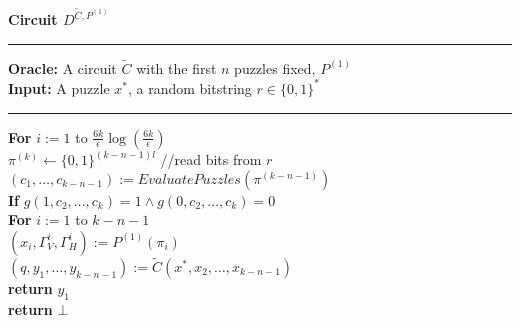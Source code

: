 %
\begin{codeblock}
  \textbf{Circuit $D^{\widetilde{C}, P^{(1)}}$}
  \medskip

  \hrule

  \medskip

  \textbf{Oracle:} A circuit $\widetilde{C}$ with the first $n$ puzzles fixed, $P^{(1)}$\\
  \textbf{Input:} A puzzle $x^*$, a random bitstring $r \in \{0,1\}^{*}$

  \medskip\hrule\medskip
  \textbf{For} $i:=1$ to $\frac{6k}{\epsilon} \log(\frac{6k}{\epsilon})$\\
  \IndI $\pi^{(k)} \leftarrow \{0,1\}^{(k-n-1)l}$ //read bits from $r$  \\
  \IndI $(c_1, \dots, c_{k-n-1}) := EvaluatePuzzles(\pi^{(k-n-1)})$\\
  \IndI \textbf{If} $g(1,c_2, \dots, c_k) =1 \land g(0,c_2, \dots, c_k) = 0$\\
  \IndII \textbf{For} $i:=1$ to $k-n-1$\\
  \IndIII $(x_i, \Gamma_V^{i}, \Gamma_H^{i}) := P^{(1)}(\pi_i)$\\
  \IndII $(q, y_1, \dots, y_{k-n-1}) := \widetilde{C}(x^*, x_2, \dots, x_{k-n-1})$\\
  \IndII \textbf{return} $y_1$\\
  \textbf{return} $\bot$ \\

\end{codeblock}
%
